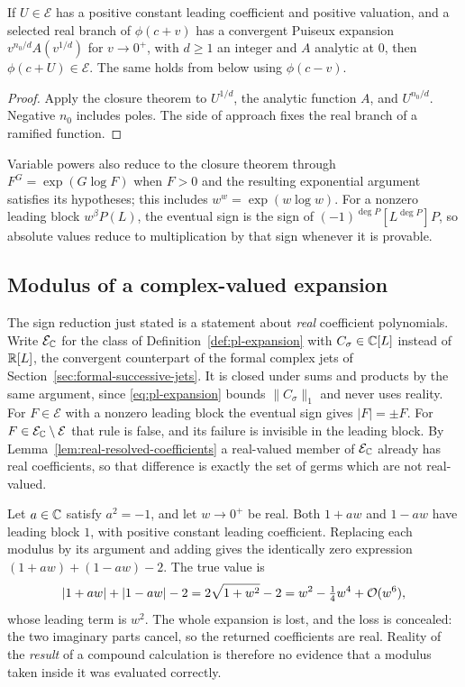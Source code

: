 \begin{corollary}
If $U\in\mathcal E$ has a positive constant leading coefficient and positive valuation, and a selected real branch of $\phi(c+v)$ has a convergent Puiseux expansion $v^{n_0/d}A(v^{1/d})$ for $v\to0^+$, with $d\ge1$ an integer and $A$ analytic at $0$, then $\phi(c+U)\in\mathcal E$. The same holds from below using $\phi(c-v)$.
\end{corollary}
\begin{proof}
Apply the closure theorem to $U^{1/d}$, the analytic function $A$, and $U^{n_0/d}$. Negative $n_0$ includes poles. The side of approach fixes the real branch of a ramified function.
\end{proof}

Variable powers also reduce to the closure theorem through $F^G=\exp(G\log F)$ when $F>0$ and the resulting exponential argument satisfies its hypotheses; this includes $w^w=\exp(w\log w)$. For a nonzero leading block $w^\beta P(L)$, the eventual sign is the sign of $(-1)^{\deg P}[L^{\deg P}]P$, so absolute values reduce to multiplication by that sign whenever it is provable.

\subsection{Modulus of a complex-valued expansion}
\label{sec:modulus}

The sign reduction just stated is a statement about \emph{real} coefficient
polynomials. Write $\mathcal E_\mathbb C$ for the class of Definition~\ref{def:pl-expansion}
with $C_\sigma\in\mathbb C[L]$ instead of $\mathbb R[L]$, the convergent counterpart of the
formal complex jets of Section~\ref{sec:formal-successive-jets}. It is closed
under sums and products by the same argument, since \eqref{eq:pl-expansion}
bounds $\|C_\sigma\|_1$ and never uses reality. For $F\in\mathcal E$ with a
nonzero leading block the eventual sign gives $|F|=\pm F$. For
$F\in\mathcal E_\mathbb C\setminus\mathcal E$ that rule is false, and its failure is
invisible in the leading block. By Lemma~\ref{lem:real-resolved-coefficients} a
real-valued member of $\mathcal E_\mathbb C$ already has real coefficients, so that
difference is exactly the set of germs which are not real-valued.

\begin{example}
\label{ex:modulus-cancellation}
Let $a\in\mathbb C$ satisfy $a^2=-1$, and let $w\to0^+$ be real. Both $1+aw$ and
$1-aw$ have leading block $1$, with positive constant leading coefficient.
Replacing each modulus by its argument and adding gives the identically zero
expression $(1+aw)+(1-aw)-2$. The true value is
\[
 |1+aw|+|1-aw|-2=2\sqrt{1+w^2}-2=w^2-\tfrac14w^4+\mathcal O(w^6),
\]
whose leading term is $w^2$. The whole expansion is lost, and the loss is
concealed: the two imaginary parts cancel, so the returned coefficients are
real. Reality of the \emph{result} of a compound calculation is therefore no
evidence that a modulus taken inside it was evaluated correctly.
\end{example}

